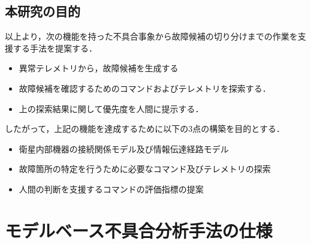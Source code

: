 \documentclass[11pt]{jsarticle}%
\begin{document}
\begin{multicols}{2}
\vspace{-1zh}
\begin{table}[H]
  \centering
  \caption{不具合分析手法の比較}
  \label{tab:previous_research}
\end{table}
\vspace{-1zh}
\subsection{本研究の目的}
  以上より，次の機能を持った不具合事象から故障候補の切り分けまでの作業を支援する手法を提案する．
  \begin{itemize}
  \item 異常テレメトリから，故障候補を生成する
  \item 故障候補を確認するためのコマンドおよびテレメトリを探索する．
  \item 上の探索結果に関して優先度を人間に提示する．
\end{itemize}
したがって，上記の機能を達成するために以下の3点の構築を目的とする．%
\begin{itemize}
  \item 衛星内部機器の接続関係モデル及び情報伝達経路モデル
  \item 故障箇所の特定を行うために必要なコマンド及びテレメトリの探索
  \item 人間の判断を支援するコマンドの評価指標の提案
\end{itemize}
\vspace{-1zh}
\section{モデルベース不具合分析手法の仕様}
\vspace{-1zh}

\end{multicols}
\end{document}
